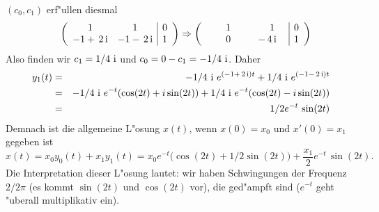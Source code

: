 \begin{bspX}
$(c_0, c_1)$ erf"ullen diesmal
\begin{eqnarray*}
&&\left(\begin{array}{cc|c} 
1 & 1 & 0\\
-1+\,2\,{\rm i} & -1-\,2\,{\rm i}  &1\\
\end{array}\right) \Rightarrow
\left(\begin{array}{cc|c} 
\qquad 1 \quad & \qquad 1\quad & 0\\
\qquad 0 \quad & -\,4\,{\rm i}  & 1  \\
\end{array}\right)\\
\end{eqnarray*}
Also finden wir $c_1 = 1/4\,\,{\rm i}$ und $c_0 = 0-c_1 = -1/4\,\,{\rm i}$. Daher
\begin{eqnarray*}
y_1(t) 
& = & 
-1/4\,\,{\rm i}\,\,e^{(- 1 + \, 2 \,{\rm i})t} + 
1/4\,\,{\rm i}\,\,e^{(- 1 - \, 2 \,{\rm i})t} \\
& = & 
-1/4\,\,{\rm i}\,\,e^{-t} (\cos(2 t) + i\sin(2t))  
+1/4\,\,{\rm i}\,\,e^{-t}(\cos(2 t) -  i\sin(2t))\\
& = & 1/2 e^{-t} \,\sin(2t)
\end{eqnarray*}
Demnach ist die allgemeine L"osung $x(t)$, wenn $x(0) = x_0$ und $x'(0) = x_1$ gegeben ist
$$ x(t) = x_0 y_0(t) + x_1 y_1(t) 
= x_0 e^{-t}\big( \cos(2 t)  + 1/2 \sin(2t)\big) + 
    \frac {x_1}{2} e^{-t} \,\sin(2t).
    $$
Die Interpretation dieser L"osung lautet: wir haben Schwingungen der Frequenz $2/2\pi$ 
(es kommt $\sin(2t)$ und $\cos(2t)$ vor), die ged"ampft sind ($e^{-t}$ geht "uberall multiplikativ ein).
\end{bspX}
